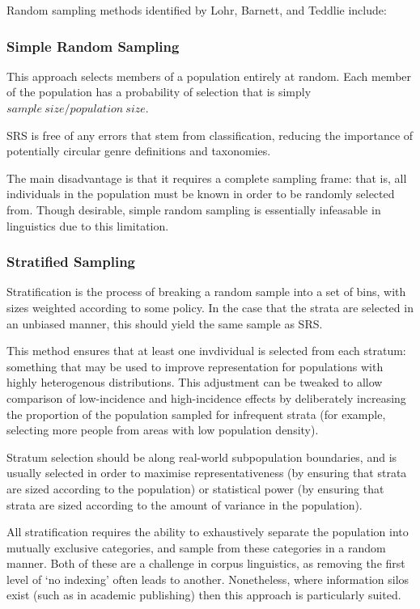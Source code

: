 Random sampling methods identified by Lohr, Barnett, and Teddlie include\cite{lohr2009sampling,barnett1991sample,Teddlie01012007}:

\subsubsection{Simple Random Sampling}
This approach selects members of a population entirely at random.  Each member of the population has a probability of selection that is simply $sample~size/population~size$.

SRS is free of any errors that stem from classification, reducing the importance of potentially circular genre definitions and taxonomies.

The main disadvantage is that it requires a complete sampling frame: that is, all individuals in the population must be known in order to be randomly selected from.  Though desirable, simple random sampling is essentially infeasable in linguistics due to this limitation.



\subsubsection{Stratified Sampling}
Stratification is the process of breaking a random sample into a set of bins, with sizes weighted according to some policy.  In the case that the strata are selected in an unbiased manner, this should yield the same sample as SRS.

This method ensures that at least one invdividual is selected from each stratum: something that may be used to improve representation for populations with highly heterogenous distributions.  This adjustment can be tweaked to allow comparison of low-incidence and high-incidence effects by deliberately increasing the proportion of the population sampled for infrequent strata (for example, selecting more people from areas with low population density).

Stratum selection should be along real-world subpopulation boundaries, and is usually selected in order to maximise representativeness (by ensuring that strata are sized according to the population) or statistical power (by ensuring that strata are sized according to the amount of variance in the population).

All stratification requires the ability to exhaustively separate the population into mutually exclusive categories, and sample from these categories in a random manner.  Both of these are a challenge in corpus linguistics, as removing the first level of `no indexing' often leads to another.  Nonetheless, where information silos exist (such as in academic publishing) then this approach is particularly suited.


